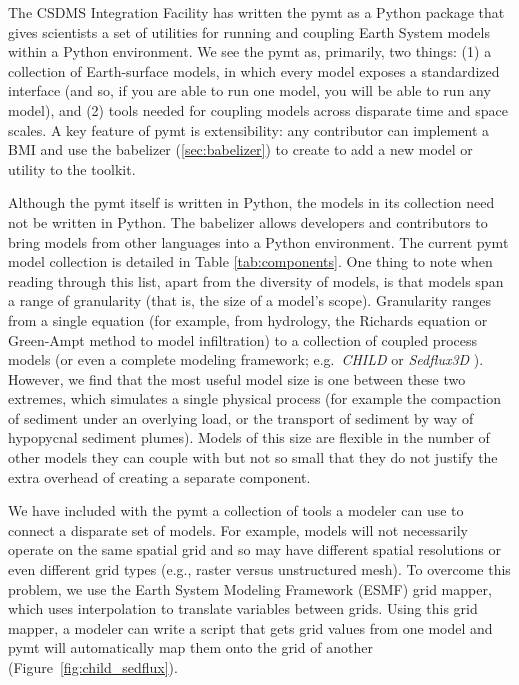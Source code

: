 \documentclass{article} %
\begin{document}
The CSDMS Integration Facility has written the pymt as a Python package that gives
scientists a set of utilities for running and coupling Earth
System models within a Python environment. We see the pymt
as, primarily, two things:
(1) a collection of Earth-surface models, in which every model exposes
a standardized interface (and so, if you are able to run one model,
you will be able to run any model), and
(2) tools needed for coupling models across disparate time and space scales. 
A key feature of pymt is extensibility: any contributor can implement a BMI and use the babelizer (\ref{sec:babelizer}) to create to add a new model or utility to the toolkit.

Although the pymt itself is written in Python, the models in its
collection need not be written in Python. The babelizer allows developers and contributors to bring 
models from other languages into a Python environment. The current 
pymt model collection is detailed
in Table \ref{tab:components}. One thing to note when reading through
this list, apart from the diversity of models, is that models span a range of granularity (that is, the size of a model's scope). 
Granularity ranges from a single equation
(for example, from hydrology, the Richards equation or Green-Ampt method to model
infiltration) to a collection of coupled process models (or even
a complete modeling framework; e.g.\ \textit{CHILD} \citep{tucker2001channel} or \textit{Sedflux3D} \citep{hutton2008sedflux}). However, we find that the most useful
model size is one between these two extremes, which simulates a single physical process (for example the compaction of sediment under an overlying load, or the transport of sediment by way of hypopycnal sediment plumes). Models of this
size are flexible in the number of other models they can couple with but
not so small that they do not justify the extra overhead of creating a separate
component.



We have included with the pymt a collection of tools a modeler can use to
connect a disparate set of models. For example, models will not
necessarily operate on the same spatial grid and so may have different
spatial resolutions or even different grid types (e.g., raster versus 
unstructured mesh). To overcome this problem, we use
the Earth System Modeling Framework (ESMF) grid mapper, which uses interpolation to translate variables between grids. Using this grid
mapper, a modeler can write a script that gets grid values from
one model and pymt will automatically map them onto the grid of 
another (Figure~\ref{fig:child_sedflux}).
\end{document}
